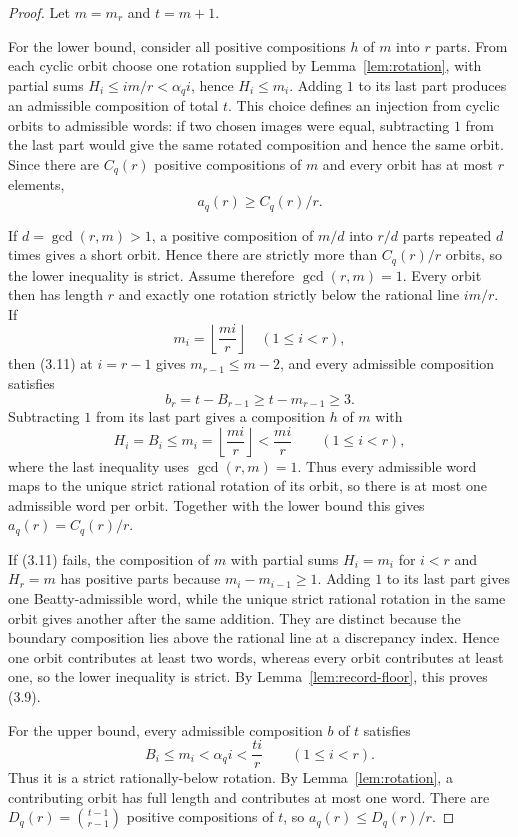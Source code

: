 \documentclass[11pt]{article}
\begin{document}
\begin{proof}
Let \(m=m_r\) and \(t=m+1\).

For the lower bound, consider all positive compositions \(h\) of \(m\)
into \(r\) parts. From each cyclic orbit choose one rotation supplied by
Lemma~\ref{lem:rotation}, with partial sums
\(H_i\leq im/r<\alpha_q i\), hence \(H_i\leq m_i\). Adding \(1\) to
its last part produces an admissible composition of total \(t\). This
choice defines an injection from cyclic orbits to admissible words: if two
chosen images were equal, subtracting \(1\) from the last part would give
the same rotated composition and hence the same orbit. Since there are
\(C_q(r)\) positive compositions of \(m\) and every orbit has at most
\(r\) elements,
\[
 a_q(r)\geq C_q(r)/r.
\]

If \(d=\gcd(r,m)>1\), a positive composition of \(m/d\) into \(r/d\)
parts repeated \(d\) times gives a short orbit. Hence there are strictly
more than \(C_q(r)/r\) orbits, so the lower inequality is strict. Assume
therefore \(\gcd(r,m)=1\). Every orbit then has length \(r\) and exactly
one rotation strictly below the rational line \(im/r\). If
\[
 m_i=\left\lfloor\frac{mi}{r}\right\rfloor
 \quad(1\leq i<r),
 \tag{3.11}
\]
then (3.11) at \(i=r-1\) gives \(m_{r-1}\leq m-2\), and every
admissible composition satisfies
\[
 b_r=t-B_{r-1}\geq t-m_{r-1}\geq3.
\]
Subtracting \(1\) from its last part gives a composition \(h\) of \(m\)
with
\[
 H_i=B_i\leq m_i=
 \left\lfloor\frac{mi}{r}\right\rfloor<\frac{mi}{r}
 \qquad(1\leq i<r),
\]
where the last inequality uses \(\gcd(r,m)=1\). Thus every admissible
word maps to the unique strict rational rotation of its orbit, so there is
at most one admissible word per orbit. Together with the lower bound this
gives \(a_q(r)=C_q(r)/r\).

If (3.11) fails, the composition of \(m\) with partial sums \(H_i=m_i\)
for \(i<r\) and \(H_r=m\) has positive parts because
\(m_i-m_{i-1}\geq1\). Adding \(1\) to its last part gives one
Beatty-admissible word, while the unique strict rational rotation in the
same orbit gives another after the same addition. They are distinct
because the boundary composition lies above the rational line at a
discrepancy index. Hence one orbit contributes at least two words, whereas
every orbit contributes at least one, so the lower inequality is strict.
By Lemma~\ref{lem:record-floor}, this proves (3.9).

For the upper bound, every admissible composition \(b\) of \(t\) satisfies
\[
 B_i\leq m_i<\alpha_q i<\frac{ti}{r}
 \qquad(1\leq i<r).
\]
Thus it is a strict rationally-below rotation. By Lemma~\ref{lem:rotation},
a contributing orbit has full length and contributes at most one word.
There are \(D_q(r)=\binom{t-1}{r-1}\) positive compositions of \(t\), so
\(a_q(r)\leq D_q(r)/r\).


\end{proof}
\end{document}
